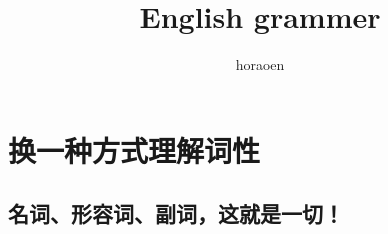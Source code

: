 \documentclass{ctexart}
\title{English grammer}
\author{horaoen}
\begin{document}
  \maketitle
  \section{换一种方式理解词性}
  \subsection{名词、形容词、副词，这就是一切！}
\end{document}
